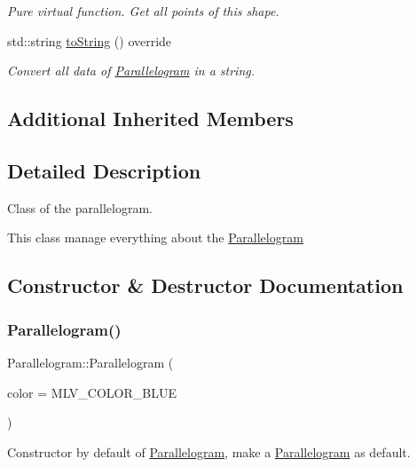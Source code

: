 \begin{DoxyCompactItemize}
\begin{DoxyCompactList}\small\item\em Pure virtual function. Get all points of this shape. \end{DoxyCompactList}\item 
std\+::string \hyperlink{classParallelogram_a9caae0044f23d8a1e87b1a78d852c37f}{to\+String} () override
\begin{DoxyCompactList}\small\item\em Convert all data of \hyperlink{classParallelogram}{Parallelogram} in a string. \end{DoxyCompactList}\end{DoxyCompactItemize}
\subsection*{Additional Inherited Members}


\subsection{Detailed Description}
Class of the parallelogram. 

This class manage everything about the \hyperlink{classParallelogram}{Parallelogram} 

\subsection{Constructor \& Destructor Documentation}
\mbox{\label{classParallelogram_a2200aa50be9b13ccb40a371a3d2b119b}} 
\subsubsection{\texorpdfstring{Parallelogram()}{Parallelogram()}\hspace{0.1cm}{\footnotesize\ttfamily [1/3]}}
{\footnotesize\ttfamily Parallelogram\+::\+Parallelogram (\begin{DoxyParamCaption}\item[{M\+L\+V\+\_\+\+Color}]{color = {\ttfamily MLV\+\_\+COLOR\+\_\+BLUE} }\end{DoxyParamCaption})\hspace{0.3cm}{\ttfamily [explicit]}}



Constructor by default of \hyperlink{classParallelogram}{Parallelogram}, make a \hyperlink{classParallelogram}{Parallelogram} as default. 


